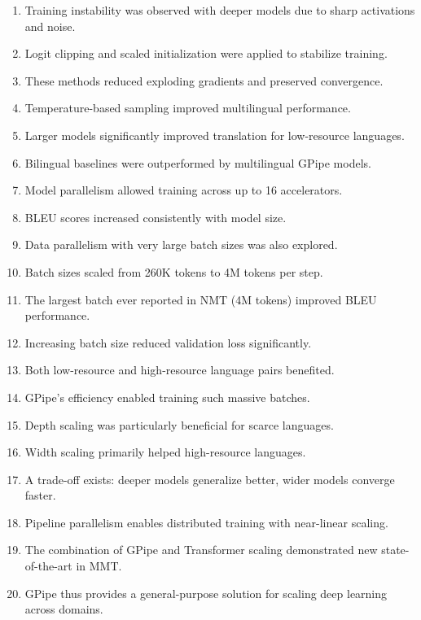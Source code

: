 \documentclass[12pt]{article}
\begin{document}
\begin{enumerate}
\item Training instability was observed with deeper models due to sharp activations and noise.  
\item Logit clipping and scaled initialization were applied to stabilize training.  
\item These methods reduced exploding gradients and preserved convergence.  
\item Temperature-based sampling improved multilingual performance.  
\item Larger models significantly improved translation for low-resource languages.  
\item Bilingual baselines were outperformed by multilingual GPipe models.  
\item Model parallelism allowed training across up to 16 accelerators.  
\item BLEU scores increased consistently with model size.  
\item Data parallelism with very large batch sizes was also explored.  
\item Batch sizes scaled from 260K tokens to 4M tokens per step.  

\item The largest batch ever reported in NMT (4M tokens) improved BLEU performance.  
\item Increasing batch size reduced validation loss significantly.  
\item Both low-resource and high-resource language pairs benefited.  
\item GPipe’s efficiency enabled training such massive batches.  
\item Depth scaling was particularly beneficial for scarce languages.  
\item Width scaling primarily helped high-resource languages.  
\item A trade-off exists: deeper models generalize better, wider models converge faster.  
\item Pipeline parallelism enables distributed training with near-linear scaling.  
\item The combination of GPipe and Transformer scaling demonstrated new state-of-the-art in MMT.  
\item GPipe thus provides a general-purpose solution for scaling deep learning across domains.  

\end{enumerate}
\end{document}
